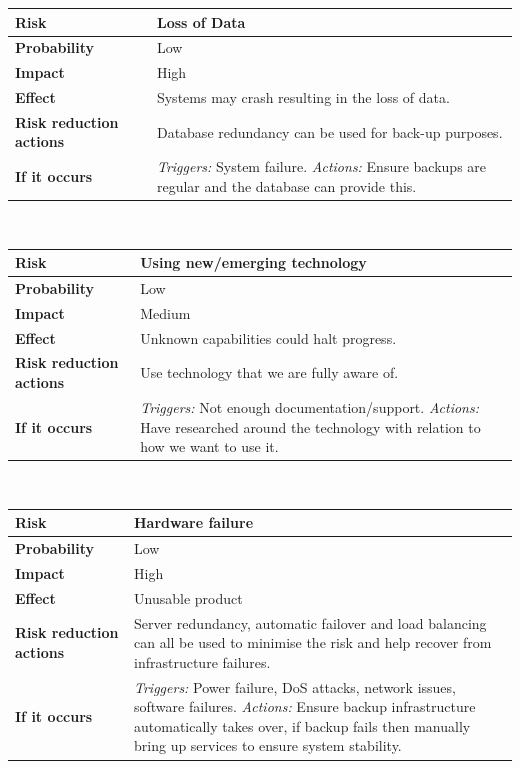 \noindent
\begin{tabular}{|l || p{10.3cm}|}
\hline
\textbf{Risk} & Loss of Data \\ \hline
\textbf{Probability} & Low \\ \hline
\textbf{Impact} & High \\ \hline
\textbf{Effect} & Systems may crash resulting in the loss of data.\\ \hline
\textbf{Risk reduction actions} & Database redundancy can be used for back-up purposes. \\ \hline
\textbf{If it occurs} &  \emph{Triggers:} System failure.  \emph{Actions:} Ensure backups are regular and the database can provide this.\\
\hline
\end{tabular}\\
\vspace{0.5cm}

\noindent
\begin{tabular}{|l || p{10.3cm}|}
\hline
\textbf{Risk} & Using new/emerging technology \\ \hline
\textbf{Probability} & Low \\ \hline
\textbf{Impact} & Medium \\ \hline
\textbf{Effect} & Unknown capabilities could halt progress.\\ \hline
\textbf{Risk reduction actions} & Use technology that we are fully aware of. \\ \hline
\textbf{If it occurs} &  \emph{Triggers:} Not enough documentation/support.  \emph{Actions:} Have researched around the technology with relation to how we want to use it.\\
\hline
\end{tabular}\\
\vspace{0.5cm}

\noindent
\begin{tabular}{|l || p{10.3cm}|}
\hline
\textbf{Risk} & Hardware failure\\ \hline
\textbf{Probability} & Low \\ \hline
\textbf{Impact} & High \\ \hline
\textbf{Effect} & Unusable product\\ \hline
\textbf{Risk reduction actions} & Server redundancy, automatic failover and load balancing can all be used to minimise the risk and help recover from infrastructure failures. \\ \hline
\textbf{If it occurs} &  \emph{Triggers:} Power failure, DoS attacks, network issues, software failures.  \emph{Actions:} Ensure backup infrastructure automatically takes over, if backup fails then manually bring up services to ensure system stability.\\
\hline
\end{tabular}\\
\vspace{0.5cm}
